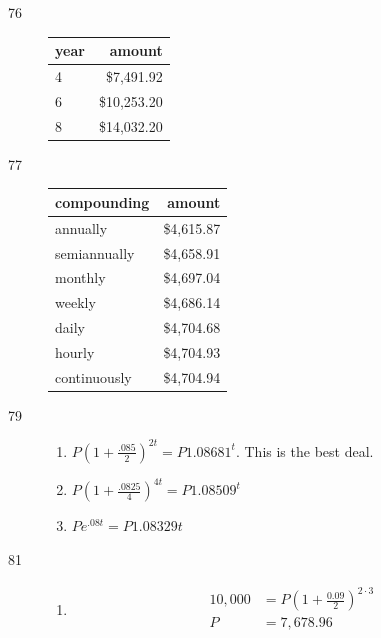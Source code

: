 \documentclass{exam}
\begin{document}
\begin{description}
      \item[76]
        \begin{tabular}[H]{lr}
          \toprule
          year & amount \\
          \midrule
          4    & \$7,491.92 \\
          6    & \$10,253.20 \\
          8    & \$14,032.20 \\
          \bottomrule
        \end{tabular}

      \item[77]
        \begin{tabular}[H]{lr}
          \toprule
          compounding  & amount \\
          \midrule
          annually     & \$4,615.87 \\
          semiannually & \$4,658.91 \\
          monthly      & \$4,697.04 \\
          weekly       & \$4,686.14 \\
          daily        & \$4,704.68 \\
          hourly       & \$4,704.93 \\
          continuously & \$4,704.94 \\
          \bottomrule
        \end{tabular}

      \item[79]
        \begin{enumerate}[i]
          \item $P \left( 1 + \frac{.085}{2} \right)^{2t} = P 1.08681^t$.  This is the best deal.
          \item $P \left( 1 + \frac{.0825}{4} \right)^{4t} = P 1.08509^t$
          \item $P e^{.08t} = P 1.08329 t$
        \end{enumerate}

      \item[81]
        \begin{enumerate}[a]
          \item 
            \begin{align*}
              10,000 &= P  \left( 1 + \frac{0.09}{2} \right)^{2 \cdot 3} \\
              P      &= 7,678.96 \\
            \end{align*}


\end{enumerate}
\end{description}
\end{document}
